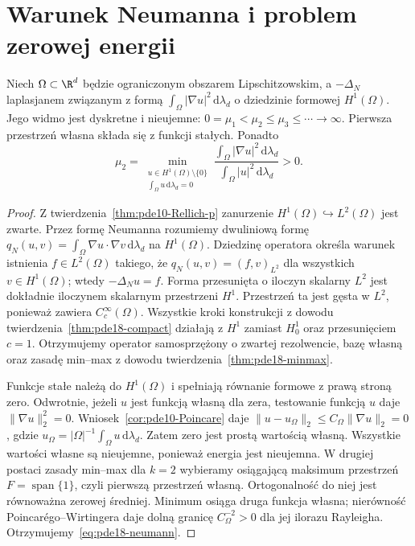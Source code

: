 \section{Warunek Neumanna i problem zerowej energii}
\label{sec:pde18-neumann}
\begin{twierdzenie}
\label{thm:pde18-neumann}
Niech $\Omega\subset\R^d$ będzie ograniczonym
obszarem Lipschitzowskim, a $-\Delta_N$ laplasjanem
związanym z formą $\int_\Omega|\nabla u|^2\,
\mathrm d\lambda_d$ o dziedzinie formowej $H^1(\Omega)$.
Jego widmo jest dyskretne i nieujemne:
$0=\mu_1<\mu_2\le\mu_3\le\cdots\to\infty$.
Pierwsza przestrzeń własna składa się z funkcji stałych.
Ponadto
\begin{equation}\label{eq:pde18-neumann}
 \mu_2=\min_{\substack{u\in H^1(\Omega)\setminus\{0\}\\
 \int_\Omega u\,\mathrm d\lambda_d=0}}
 \frac{\int_\Omega|\nabla u|^2\,\mathrm d\lambda_d}
 {\int_\Omega|u|^2\,\mathrm d\lambda_d}>0.
\end{equation}
\end{twierdzenie}
\begin{proof}
Z twierdzenia~\ref{thm:pde10-Rellich-p} zanurzenie
$H^1(\Omega)\hookrightarrow L^2(\Omega)$ jest zwarte.
Przez formę Neumanna rozumiemy dwuliniową formę
$q_N(u,v)=\int_\Omega\nabla u\cdot\nabla v\,\mathrm d\lambda_d$
na $H^1(\Omega)$. Dziedzinę operatora określa warunek
istnienia $f\in L^2(\Omega)$ takiego, że
$q_N(u,v)=(f,v)_{L^2}$ dla wszystkich $v\in H^1(\Omega)$;
wtedy $-\Delta_Nu=f$. Forma przesunięta o iloczyn
skalarny $L^2$ jest dokładnie iloczynem skalarnym
przestrzeni $H^1$.
Przestrzeń ta jest gęsta w $L^2$, ponieważ zawiera
$C_c^\infty(\Omega)$. Wszystkie kroki konstrukcji
z dowodu twierdzenia~\ref{thm:pde18-compact}
działają z $H^1$ zamiast $H_0^1$ oraz przesunięciem
$c=1$. Otrzymujemy operator samosprzężony o zwartej
rezolwencie, bazę własną oraz zasadę min--max
z dowodu twierdzenia~\ref{thm:pde18-minmax}.

Funkcje stałe należą do $H^1(\Omega)$ i spełniają
równanie formowe z prawą stroną zero. Odwrotnie,
jeżeli $u$ jest funkcją własną dla zera, testowanie
funkcją $u$ daje $\|\nabla u\|_2^2=0$.
Wniosek~\ref{cor:pde10-Poincare} daje
$\|u-u_\Omega\|_2\le C_\Omega\|\nabla u\|_2=0$,
gdzie $u_\Omega=|\Omega|^{-1}\int_\Omega u\,\mathrm d\lambda_d$.
Zatem zero jest prostą wartością własną.
Wszystkie wartości własne są nieujemne, ponieważ
energia jest nieujemna. W drugiej postaci zasady min--max
dla $k=2$ wybieramy osiągającą maksimum przestrzeń
$F=\operatorname{span}\{1\}$, czyli pierwszą przestrzeń
własną. Ortogonalność do niej jest równoważna zerowej
średniej. Minimum osiąga druga funkcja własna;
nierówność Poincarégo--Wirtingera daje dolną granicę
$C_\Omega^{-2}>0$ dla jej ilorazu Rayleigha.
Otrzymujemy~\eqref{eq:pde18-neumann}.
\end{proof}

